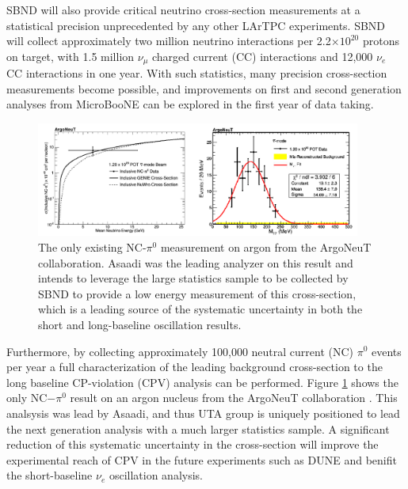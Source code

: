 SBND will also provide critical neutrino cross-section measurements at a statistical precision unprecedented by any other LArTPC experiments.  SBND will collect approximately two million neutrino interactions per 2.2$\times 10^{20}$ protons on target, with 1.5 million $\nu_{\mu}$ charged current (CC) interactions and 12,000 $\nu_{e}$ CC interactions in one year. With such statistics, many precision cross-section measurements become possible, and improvements on first and second generation analyses from MicroBooNE can be explored in the first year of data taking.

\begin{figure}[htb]
\centering
\includegraphics[width=0.95\textwidth]{images/ArgoNeuTPizeroResult.png}
\caption[]{The only existing NC-$\pi^0$ measurement on argon from the ArgoNeuT collaboration. Asaadi was the leading analyzer on this result and intends to leverage the large statistics sample to be collected by SBND to provide a low energy measurement of this cross-section, which is a leading source of the systematic uncertainty in both the short and long-baseline oscillation results.}
\label{fig:argoneutpizero}
\end{figure} 

Furthermore, by collecting approximately 100,000 neutral current (NC) $\pi^{0}$ events per year a full characterization of the leading background cross-section to the long baseline CP-violation (CPV) analysis can be performed. Figure \ref{fig:argoneutpizero} shows the only NC$-\pi^0$ result on an argon nucleus from the ArgoNeuT collaboration \cite{Argoneut}. This analsysis was lead by Asaadi, and thus UTA group is uniquely positioned to lead the next generation analysis with a much larger statistics sample. A significant reduction of this systematic uncertainty in the cross-section will improve the experimental reach of CPV in the future experiments such as DUNE and benifit the short-baseline $\nu_{e}$ oscillation analysis.
